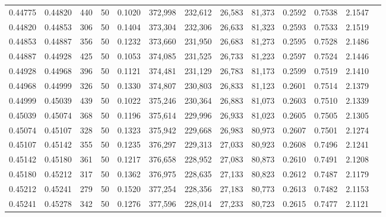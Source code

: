\begin{tabular}{rrrrrrrrrrrrr}
0.44775 & 0.44820 &   440 &  50 &                                     0.1020 & 372,998 & 232,612 &  26,583 &  81,373 & 0.2592 & 0.7538 & 2.1547 \\
0.44820 & 0.44853 &   306 &  50 &                                     0.1404 & 373,304 & 232,306 &  26,633 &  81,323 & 0.2593 & 0.7533 & 2.1519 \\
0.44853 & 0.44887 &   356 &  50 &                                     0.1232 & 373,660 & 231,950 &  26,683 &  81,273 & 0.2595 & 0.7528 & 2.1486 \\
0.44887 & 0.44928 &   425 &  50 &                                     0.1053 & 374,085 & 231,525 &  26,733 &  81,223 & 0.2597 & 0.7524 & 2.1446 \\
0.44928 & 0.44968 &   396 &  50 &                                     0.1121 & 374,481 & 231,129 &  26,783 &  81,173 & 0.2599 & 0.7519 & 2.1410 \\
0.44968 & 0.44999 &   326 &  50 &                                     0.1330 & 374,807 & 230,803 &  26,833 &  81,123 & 0.2601 & 0.7514 & 2.1379 \\
0.44999 & 0.45039 &   439 &  50 &                                     0.1022 & 375,246 & 230,364 &  26,883 &  81,073 & 0.2603 & 0.7510 & 2.1339 \\
0.45039 & 0.45074 &   368 &  50 &                                     0.1196 & 375,614 & 229,996 &  26,933 &  81,023 & 0.2605 & 0.7505 & 2.1305 \\
0.45074 & 0.45107 &   328 &  50 &                                     0.1323 & 375,942 & 229,668 &  26,983 &  80,973 & 0.2607 & 0.7501 & 2.1274 \\
0.45107 & 0.45142 &   355 &  50 &                                     0.1235 & 376,297 & 229,313 &  27,033 &  80,923 & 0.2608 & 0.7496 & 2.1241 \\
0.45142 & 0.45180 &   361 &  50 &                                     0.1217 & 376,658 & 228,952 &  27,083 &  80,873 & 0.2610 & 0.7491 & 2.1208 \\
0.45180 & 0.45212 &   317 &  50 &                                     0.1362 & 376,975 & 228,635 &  27,133 &  80,823 & 0.2612 & 0.7487 & 2.1179 \\
0.45212 & 0.45241 &   279 &  50 &                                     0.1520 & 377,254 & 228,356 &  27,183 &  80,773 & 0.2613 & 0.7482 & 2.1153 \\
0.45241 & 0.45278 &   342 &  50 &                                     0.1276 & 377,596 & 228,014 &  27,233 &  80,723 & 0.2615 & 0.7477 & 2.1121 \\

\end{tabular}
